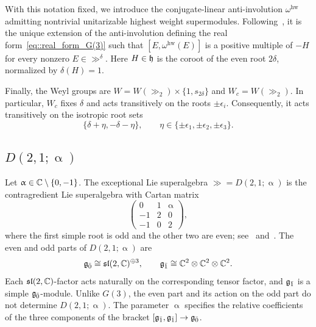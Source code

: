 With this notation fixed, we introduce the conjugate-linear anti-involution $\omega^{\operatorname{hw}}$ admitting nontrivial unitarizable highest weight supermodules. Following~\cite[Equation~(11.15) and Propositions~11.2--11.5]{jakobsen1994full}, it is the unique extension of the anti-involution defining the real form~\eqref{eq::real_form_G(3)} such that $[E,\omega^{\operatorname{hw}}(E)]$ is a positive multiple of $-H$ for every nonzero $E\in\gg^\delta$. Here $H\in{\mathfrak h}$ is the coroot of the even root $2\delta$, normalized by $\delta(H)=1$.

Finally, the Weyl groups are
$
W
=
W(\gg_2)\times\{1,s_{2\delta}\}$ and $
W_c=W(\gg_2).
$
In particular, $W_c$ fixes $\delta$ and acts transitively on the roots $\pm\epsilon_i$. Consequently, it acts transitively on the isotropic root sets
\begin{equation}
\{\delta+\eta,-\delta-\eta\},
\qquad
\eta\in
\{\pm\epsilon_1,\pm\epsilon_2,\pm\epsilon_3\}.
\end{equation}


\subsection{\texorpdfstring{$D(2,1;\upalpha)$}{D(2,1;alpha)}}
\label{subsec::appendix_D21alpha}
Let $\upalpha\in{\mathbb C}\setminus\{0,-1\}$. The exceptional Lie superalgebra $\gg=D(2,1;\upalpha)$ is the contragredient Lie superalgebra with Cartan matrix
\begin{equation}
\begin{pmatrix}
0&1&\upalpha\\
-1&2&0\\
-1&0&2
\end{pmatrix},
\end{equation}
where the first simple root is odd and the other two are even; see~\cite[Proposition~2.5.4]{Kac} and~\cite[Equation~(12.2)]{jakobsen1994full}. 
The even and odd parts of $D(2,1;\upalpha)$ are
\begin{equation*}
{\mathfrak{g}_{\bar{0}}}\cong{\mathfrak{sl}}(2,{\mathbb C})^{\oplus3},
\qquad
{\mathfrak{g}_{\bar{1}}}\cong{\mathbb C}^2\otimes{\mathbb C}^2\otimes{\mathbb C}^2.
\end{equation*}
Each ${\mathfrak{sl}}(2,{\mathbb C})$-factor acts naturally on the corresponding tensor factor, and ${\mathfrak{g}_{\bar{1}}}$ is a simple ${\mathfrak{g}_{\bar{0}}}$-module. 
Unlike $G(3)$, the even part and its action on the odd part do not determine $D(2,1;\upalpha)$. The parameter $\upalpha$ specifies the relative coefficients of the three components of the bracket $[{\mathfrak{g}_{\bar{1}}},{\mathfrak{g}_{\bar{1}}}]\to{\mathfrak{g}_{\bar{0}}}$.



